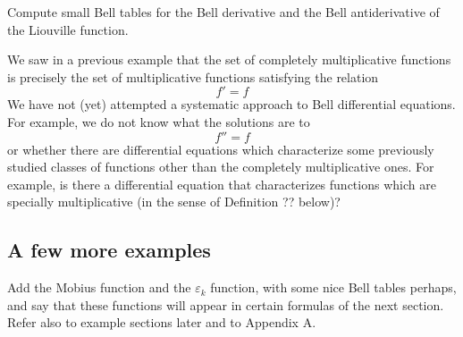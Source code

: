 \begin{exercise}
Compute small Bell tables for the Bell derivative and the Bell antiderivative of the Liouville function.
\end{exercise}



\begin{remark}
We saw in a previous example that the set of completely multiplicative functions is precisely the set of multiplicative functions satisfying the relation
$$ f' = f $$
We have not (yet) attempted a systematic approach to Bell differential equations. For example, we do not know what the solutions are to 
$$ f'' = f   $$
or whether there are differential equations which characterize some previously studied classes of functions other than the completely multiplicative ones. For example, is there a differential equation that characterizes functions which are specially multiplicative (in the sense of Definition ?? below)?
\end{remark}


\subsection{A few more examples}

Add the Mobius function and the $\varepsilon_k$ function, with some nice Bell tables perhaps, and say that these functions will appear in certain formulas of the next section. Refer also to example sections later and to Appendix A.
